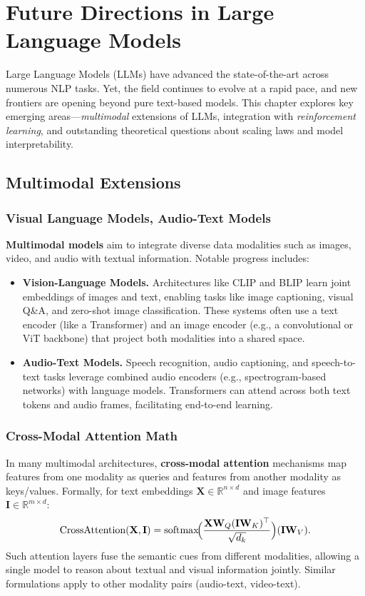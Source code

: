 \chapter{Future Directions in Large Language Models}
\label{chap:future_directions}

\noindent
Large Language Models (LLMs) have advanced the state-of-the-art across numerous NLP tasks. Yet, the field continues to evolve at a rapid pace, and new frontiers are opening beyond pure text-based models. This chapter explores key emerging areas—\emph{multimodal} extensions of LLMs, integration with \emph{reinforcement learning}, and outstanding theoretical questions about scaling laws and model interpretability.

\section{Multimodal Extensions}
\label{sec:multimodal_extensions}

\subsection{Visual Language Models, Audio-Text Models}
\noindent
\textbf{Multimodal models} aim to integrate diverse data modalities such as images, video, and audio with textual information. Notable progress includes:
\begin{itemize}
    \item \textbf{Vision-Language Models.} Architectures like CLIP and BLIP learn joint embeddings of images and text, enabling tasks like image captioning, visual Q\&A, and zero-shot image classification. These systems often use a text encoder (like a Transformer) and an image encoder (e.g., a convolutional or ViT backbone) that project both modalities into a shared space.
    \item \textbf{Audio-Text Models.} Speech recognition, audio captioning, and speech-to-text tasks leverage combined audio encoders (e.g., spectrogram-based networks) with language models. Transformers can attend across both text tokens and audio frames, facilitating end-to-end learning.
\end{itemize}

\subsection{Cross-Modal Attention Math}
\noindent
In many multimodal architectures, \textbf{cross-modal attention} mechanisms map features from one modality as queries and features from another modality as keys/values. Formally, for text embeddings \(\mathbf{X} \in \mathbb{R}^{n \times d}\) and image features \(\mathbf{I} \in \mathbb{R}^{m \times d}\):
\[
\text{CrossAttention}(\mathbf{X}, \mathbf{I}) 
= 
\text{softmax}\!\Bigl(\frac{\mathbf{X} \mathbf{W}_Q(\mathbf{I} \mathbf{W}_K)^\top}{\sqrt{d_k}}\Bigr)(\mathbf{I} \mathbf{W}_V).
\]
Such attention layers fuse the semantic cues from different modalities, allowing a single model to reason about textual and visual information jointly. Similar formulations apply to other modality pairs (audio-text, video-text).

